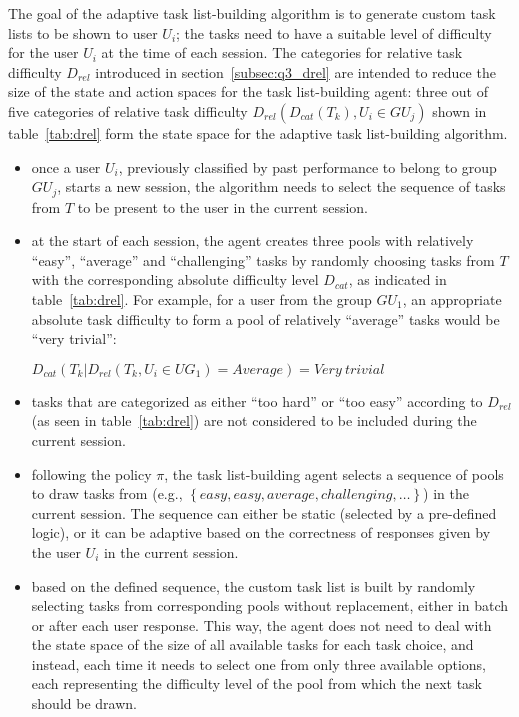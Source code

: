 The goal of the adaptive task list-building algorithm is to generate custom task lists to be shown to user $U_i$;
the tasks need to have a suitable level of difficulty for the user $U_i$ at the time of each session.
The categories for relative task difficulty $D_{rel}$ introduced in section~\ref{subsec:q3_drel} are intended to reduce the size of the state and action spaces for the task list-building agent: three out of five categories of relative task difficulty $D_{rel}(D_{cat}(T_k), U_i \in GU_j)$ shown in table~\ref{tab:drel} form the state space for the adaptive task list-building algorithm.

\begin{itemize}
    \item once a user $U_i$, previously classified by past performance to belong to group $GU_j$, starts a new session, the algorithm needs to select the sequence of tasks from $T$ to be present to the user in the current session.
    \item at the start of each session, the agent creates three pools with relatively ``easy'', ``average'' and ``challenging'' tasks by randomly choosing tasks from $T$ with the corresponding absolute difficulty level $D_{cat}$, as indicated in table~\ref{tab:drel}.
    For example, for a user from the group $GU_1$, an appropriate absolute task difficulty to form a pool of relatively ``average'' tasks would be ``very trivial'':

    $D_{cat}(T_k | D_{rel}(T_k, U_i \in UG_1 ) = Average) = Very~trivial$

    \item tasks that are categorized as either ``too hard'' or ``too easy'' according to $D_{rel}$ (as seen in table~\ref{tab:drel}) are not considered to be included during the current session.
    \item following the policy $\pi$, the task list-building agent selects a sequence of pools to draw tasks from (e.g., $\left\{easy, easy, average, challenging, \dots \right\}$) in the current session.
    The sequence can either be static (selected by a pre-defined logic), or it can be adaptive based on the correctness of responses given by the user $U_i$ in the current session.
    \item based on the defined sequence, the custom task list is built by randomly selecting tasks from corresponding pools without replacement, either in batch or after each user response.
    This way, the agent does not need to deal with the state space of the size of all available tasks for each task choice, and instead, each time it needs to select one from only three available options, each representing the difficulty level of the pool from which the next task should be drawn.
\end{itemize}

